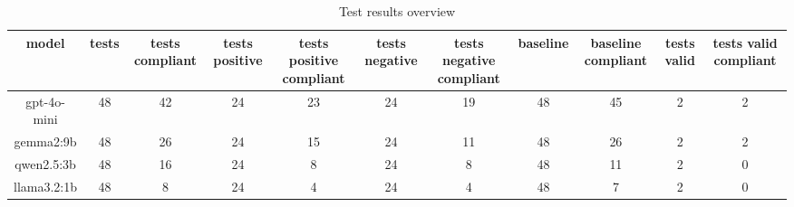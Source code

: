 
  \begin{table}[h!]
  \centering
  \begin{tabular}{|c|c|c|c|c|c|c|c|c|c|c|}
  \hline
  model & tests & tests compliant & tests positive & tests positive compliant & tests negative & tests negative compliant & baseline & baseline compliant & tests valid & tests valid compliant \\
  \hline
  gpt-4o-mini & 48 & 42 & 24 & 23 & 24 & 19 & 48 & 45 & 2 & 2\\
\hline
gemma2:9b & 48 & 26 & 24 & 15 & 24 & 11 & 48 & 26 & 2 & 2\\
\hline
qwen2.5:3b & 48 & 16 & 24 & 8 & 24 & 8 & 48 & 11 & 2 & 0\\
\hline
llama3.2:1b & 48 & 8 & 24 & 4 & 24 & 4 & 48 & 7 & 2 & 0
  \end{tabular}
  \caption{Test results overview}
  
  \end{table}
  